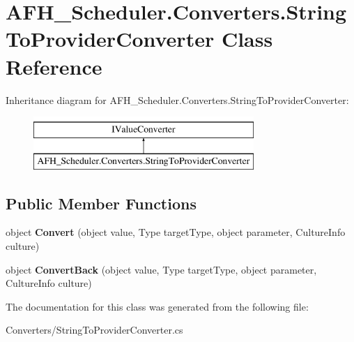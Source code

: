 \section{A\+F\+H\+\_\+\+Scheduler.\+Converters.\+String\+To\+Provider\+Converter Class Reference}
\label{class_a_f_h___scheduler_1_1_converters_1_1_string_to_provider_converter}
Inheritance diagram for A\+F\+H\+\_\+\+Scheduler.\+Converters.\+String\+To\+Provider\+Converter\+:\begin{figure}[H]
\begin{center}
\leavevmode
\includegraphics[height=2.000000cm]{class_a_f_h___scheduler_1_1_converters_1_1_string_to_provider_converter}
\end{center}
\end{figure}
\subsection*{Public Member Functions}
\begin{DoxyCompactItemize}
\item 
\mbox{\label{class_a_f_h___scheduler_1_1_converters_1_1_string_to_provider_converter_a57bf3f9237c6694ea6f28a10084f72ab}} 
object {\bfseries Convert} (object value, Type target\+Type, object parameter, Culture\+Info culture)
\item 
\mbox{\label{class_a_f_h___scheduler_1_1_converters_1_1_string_to_provider_converter_a95942bedf64d17320a7b9dded478ad99}} 
object {\bfseries Convert\+Back} (object value, Type target\+Type, object parameter, Culture\+Info culture)
\end{DoxyCompactItemize}


The documentation for this class was generated from the following file\+:\begin{DoxyCompactItemize}
\item 
Converters/String\+To\+Provider\+Converter.\+cs\end{DoxyCompactItemize}
